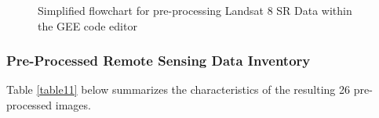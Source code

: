 \begin{figure}[H]
  \caption{Simplified flowchart for pre-processing Landsat 8 SR Data within the GEE code editor}\label{fig11}
\end{figure}

\subsubsection{Pre-Processed Remote Sensing Data Inventory}

\justify
Table \ref{table11} below summarizes the characteristics of the resulting 26 pre-processed images.

